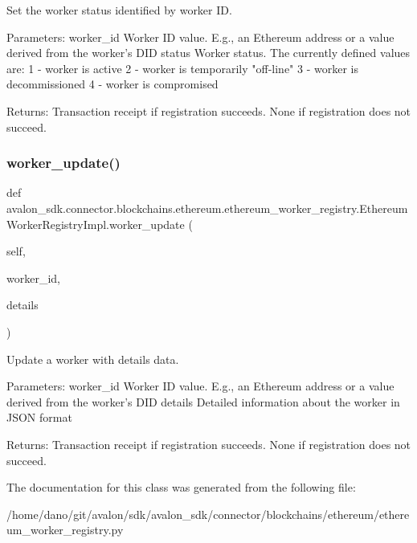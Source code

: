 \begin{DoxyVerb}Set the worker status identified by worker ID.

Parameters:
worker_id Worker ID value. E.g., an Ethereum address or
  a value derived from the worker's DID
status    Worker status. The currently defined values are:
  1 - worker is active
  2 - worker is temporarily "off-line"
  3 - worker is decommissioned
  4 - worker is compromised

Returns:
Transaction receipt if registration succeeds.
None if registration does not succeed.
\end{DoxyVerb}
 \mbox{\label{classavalon__sdk_1_1connector_1_1blockchains_1_1ethereum_1_1ethereum__worker__registry_1_1EthereumWorkerRegistryImpl_a24004184828992ce6ad467362bb00ebf}} 
\subsubsection{\texorpdfstring{worker\+\_\+update()}{worker\_update()}}
{\footnotesize\ttfamily def avalon\+\_\+sdk.\+connector.\+blockchains.\+ethereum.\+ethereum\+\_\+worker\+\_\+registry.\+Ethereum\+Worker\+Registry\+Impl.\+worker\+\_\+update (\begin{DoxyParamCaption}\item[{}]{self,  }\item[{}]{worker\+\_\+id,  }\item[{}]{details }\end{DoxyParamCaption})}

\begin{DoxyVerb}Update a worker with details data.

Parameters:
worker_id  Worker ID value. E.g., an Ethereum address or
   a value derived from the worker's DID
details    Detailed information about the worker in JSON format

Returns:
Transaction receipt if registration succeeds.
None if registration does not succeed.
\end{DoxyVerb}
 

The documentation for this class was generated from the following file\+:\begin{DoxyCompactItemize}
\item 
/home/dano/git/avalon/sdk/avalon\+\_\+sdk/connector/blockchains/ethereum/ethereum\+\_\+worker\+\_\+registry.\+py\end{DoxyCompactItemize}
